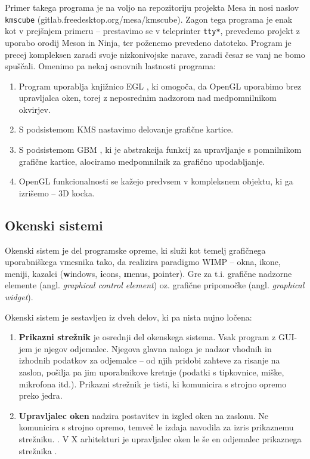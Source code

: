 \documentclass{article}
\begin{document}
Primer takega programa je na voljo na repozitoriju projekta Mesa in nosi naslov \texttt{kmscube} (gitlab.freedesktop.org/mesa/kmscube)\autocite{kmscube}. Zagon tega programa je enak kot v prejšnjem primeru -- prestavimo se v teleprinter \texttt{tty*}, prevedemo projekt z uporabo orodij Meson in Ninja, ter poženemo prevedeno datoteko. Program je precej kompleksen zaradi svoje nizkonivojske narave, zaradi česar se vanj ne bomo spuščali. Omenimo pa nekaj osnovnih lastnosti programa:

\begin{enumerate}
    \item Program uporablja knjižnico EGL \autocite{egl}, ki omogoča, da OpenGL uporabimo brez upravljalca oken, torej z neposrednim nadzorom nad medpomnilnikom okvirjev.
    \item S podsistemom KMS nastavimo delovanje grafične kartice.
    \item S podsistemom GBM \autocite{wikimesa}, ki je abstrakcija funkcij za upravljanje s pomnilnikom grafične kartice, alociramo medpomnilnik za grafično upodabljanje.
    \item OpenGL funkcionalnosti se kažejo predvsem v kompleksnem objektu, ki ga izrišemo -- 3D kocka.
\end{enumerate}

\subsection{Okenski sistemi}
Okenski sistem je del programske opreme, ki služi kot temelj grafičnega uporabniškega vmesnika tako, da realizira paradigmo WIMP \autocite{wikiwindowingsystem, stackwindowingsystem} -- okna, ikone, meniji, kazalci (\textbf{w}indows, \textbf{i}cons, \textbf{m}enus, \textbf{p}ointer). Gre za t.i. grafične nadzorne elemente (angl. \textit{graphical control element}) oz. grafične pripomočke (angl. \textit{graphical widget}).

Okenski sistem je sestavljen iz dveh delov, ki pa nista nujno ločena:

\begin{enumerate}
    \item \textbf{Prikazni strežnik} je osrednji del okenskega sistema. Vsak program z GUI-jem je njegov odjemalec. Njegova glavna naloga je nadzor vhodnih in izhodnih podatkov za odjemalce -- od njih pridobi zahteve za risanje na zaslon, pošilja pa jim uporabnikove kretnje (podatki s tipkovnice, miške, mikrofona itd.). Prikazni strežnik je tisti, ki komunicira s strojno opremo preko jedra. \autocite[poglavje \textit{Display server}]{wikiwindowingsystem}
    \item \textbf{Upravljalec oken} nadzira postavitev in izgled oken na zaslonu. Ne komunicira s strojno opremo, temveč le izdaja navodila za izris prikaznemu strežniku. \autocite{wikiwindowmanager}. V X arhitekturi je upravljalec oken le še en odjemalec prikaznega strežnika \autocite{howxworks}. 
\end{enumerate} 
\end{document}
